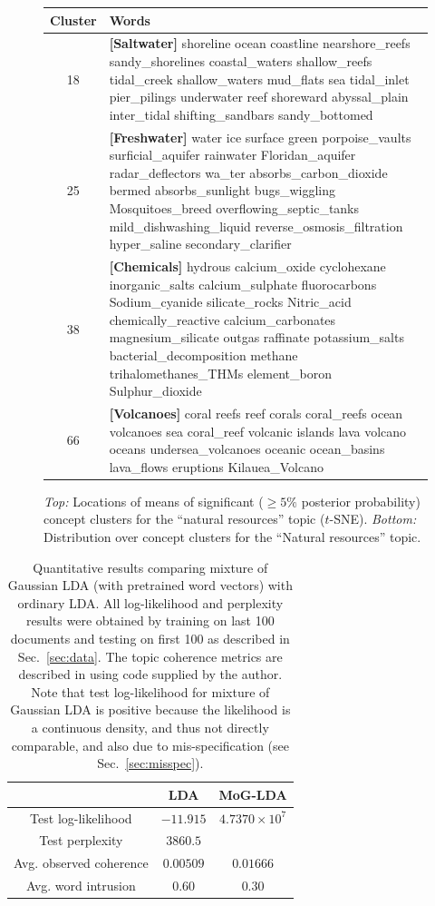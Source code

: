 \documentclass[11pt]{article}
\begin{document}
\begin{figure}
\begin{tabularx}{\columnwidth}{|c|X|}
\hline 
{\tiny{}Cluster} & {\tiny{}Words}\tabularnewline
\hline 
{\tiny{}18} & {\tiny{}\textbf{[Saltwater]} shoreline ocean coastline nearshore\_reefs sandy\_shorelines
coastal\_waters shallow\_reefs tidal\_creek shallow\_waters mud\_flats
sea tidal\_inlet pier\_pilings underwater reef shoreward abyssal\_plain
inter\_tidal shifting\_sandbars sandy\_bottomed }\tabularnewline
\hline 
{\tiny{}25} & {\tiny{}\textbf{[Freshwater]} water ice surface green porpoise\_vaults surficial\_aquifer
rainwater Floridan\_aquifer radar\_deflectors wa\_ter absorbs\_carbon\_dioxide
bermed absorbs\_sunlight bugs\_wiggling Mosquitoes\_breed overflowing\_septic\_tanks
mild\_dishwashing\_liquid reverse\_osmosis\_filtration hyper\_saline
secondary\_clarifier }\tabularnewline
\hline 
{\tiny{}38} & {\tiny{}\textbf{[Chemicals]} hydrous calcium\_oxide cyclohexane inorganic\_salts calcium\_sulphate
fluorocarbons Sodium\_cyanide silicate\_rocks Nitric\_acid chemically\_reactive
calcium\_carbonates magnesium\_silicate outgas raffinate potassium\_salts
bacterial\_decomposition methane trihalomethanes\_THMs element\_boron
Sulphur\_dioxide }\tabularnewline
\hline 
{\tiny{}66} & {\tiny{}\textbf{[Volcanoes]} coral reefs reef corals coral\_reefs ocean volcanoes sea coral\_reef
volcanic islands lava volcano oceans undersea\_volcanoes oceanic ocean\_basins
lava\_flows eruptions Kilauea\_Volcano}\tabularnewline
\hline 
\end{tabularx}

\caption{\label{fig:gtm-nat-res} \emph{Top:} Locations of means of significant ($\geq 5\%$ posterior probability) concept clusters for the ``natural resources'' topic ($t$-SNE). \emph{Bottom:} Distribution over concept clusters for the ``Natural resources'' topic.}
\end{figure}

\begin{table}
\centering
\begin{tabular}{|c|c|c|}
\cline{2-3} 
\multicolumn{1}{c|}{} & LDA & MoG-LDA\tabularnewline
\hline 
Test log-likelihood & $-11.915$ & $4.7370 \times 10^7$ \tabularnewline
\hline 
Test perplexity & $3860.5$ & \tabularnewline
\hline 
Avg. observed coherence & $0.00509$ & $0.01666$ \tabularnewline
\hline 
Avg. word intrusion & $0.60$ & $0.30$ \tabularnewline
\hline 
\end{tabular}
\caption{\label{tbl:quant} Quantitative results comparing mixture of Gaussian LDA (with pretrained word vectors) with ordinary LDA. All log-likelihood and perplexity results were obtained by training on last 100 documents and testing on first 100 as described in Sec.~\ref{sec:data}. The topic coherence metrics are described in \cite{Lau14} using code supplied by the author. Note that test log-likelihood for mixture of Gaussian LDA is positive because the likelihood is a continuous density, and thus not directly comparable, and also due to mis-specification (see Sec.~\ref{sec:misspec}).}
\end{table}
\end{document}

